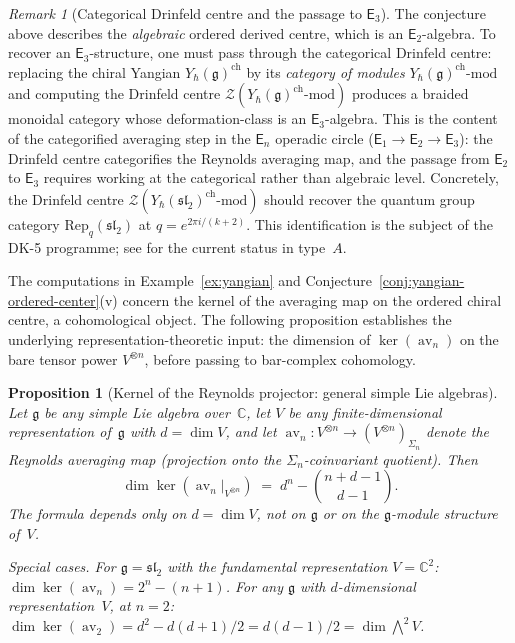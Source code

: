 \documentclass[11pt,reqno]{amsart}
\newtheorem{proposition}[theorem]{Proposition}
\theoremstyle{definition}
\theoremstyle{remark}
\newtheorem{remark}[theorem]{Remark}
\newcommand{\cZ}{\mathcal{Z}}
\newcommand{\Eone}{\mathsf{E}_{1}}
\newcommand{\Etwo}{\mathsf{E}_{2}}
\newcommand{\Ethree}{\mathsf{E}_{3}}
\newcommand{\En}{\mathsf{E}_{n}}
\DeclareMathOperator{\av}{av}
\newcommand{\fg}{\mathfrak{g}}
\newcommand{\CC}{\mathbb{C}}
\numberwithin{equation}{section}
\begin{document}
\begin{remark}[Categorical Drinfeld centre and
the passage to $\Ethree$]
\label{rem:yangian-ordered-center-categorical}
The conjecture above describes the \emph{algebraic}
ordered derived centre, which is an $\Etwo$-algebra.
To recover an $\Ethree$-structure, one must pass through
the categorical Drinfeld centre: replacing the chiral
Yangian $Y_\hbar(\fg)^{\mathrm{ch}}$ by its
\emph{category of modules}
$Y_\hbar(\fg)^{\mathrm{ch}}\textrm{-mod}$ and computing
the Drinfeld centre
$\cZ(Y_\hbar(\fg)^{\mathrm{ch}}\textrm{-mod})$
produces a braided monoidal category whose
deformation-class is an $\Ethree$-algebra.
This is the content of the categorified averaging
step in the $\En$ operadic circle
($\Eone \to \Etwo \to \Ethree$): the Drinfeld centre
categorifies the Reynolds averaging map, and
the passage from $\Etwo$ to $\Ethree$ requires
working at the categorical rather than algebraic
level. Concretely, the Drinfeld centre
$\cZ(Y_\hbar(\mathfrak{sl}_2)^{\mathrm{ch}}\textrm{-mod})$
should recover the quantum group category
$\mathrm{Rep}_q(\mathfrak{sl}_2)$ at
$q = e^{2\pi i/(k+2)}$. This identification is the
subject of the DK-5 programme; see
\cite[\S6]{Lorgat26I} for the current status in type~$A$.
\end{remark}

The computations in
Example~\ref{ex:yangian} and
Conjecture~\ref{conj:yangian-ordered-center}(v)
concern the kernel of the averaging map on the
ordered chiral centre, a cohomological object.
The following proposition establishes the underlying
representation-theoretic input: the dimension of
$\ker(\av_n)$ on the bare tensor power $V^{\otimes n}$,
before passing to bar-complex cohomology.

\begin{proposition}[Kernel of the Reynolds projector:
general simple Lie algebras]
\label{prop:ker-av-schur-weyl}
Let $\fg$ be any simple Lie algebra over~$\CC$, let
$V$ be any finite-dimensional representation of~$\fg$ with
$d = \dim V$, and let
$\av_n \colon V^{\otimes n} \to (V^{\otimes n})_{\Sigma_n}$
denote the Reynolds averaging map (projection onto the
$\Sigma_n$-coinvariant quotient).
Then
\begin{equation}\label{eq:ker-av-schur-weyl}
  \dim \ker(\av_n\big|_{V^{\otimes n}})
  \;=\;
  d^n - \binom{n+d-1}{d-1}.
\end{equation}
The formula depends only on $d = \dim V$, not on $\fg$ or
on the $\fg$-module structure of~$V$.

\smallskip
\noindent\textit{Special cases.}
For $\fg = \mathfrak{sl}_2$ with the fundamental
representation $V = \CC^2$:
$\dim\ker(\av_n) = 2^n - (n+1)$.
For any $\fg$ with $d$-dimensional representation~$V$,
at $n = 2$:
$\dim\ker(\av_2) = d^2 - d(d{+}1)/2 = d(d{-}1)/2
= \dim\bigwedge^2 V$.
\end{proposition}
\end{document}

